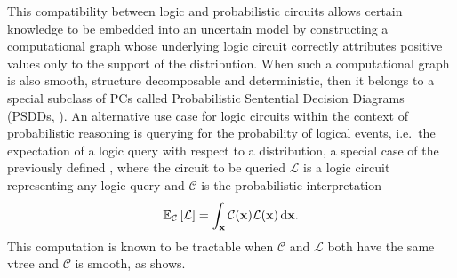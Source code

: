 This compatibility between logic and probabilistic circuits allows certain knowledge to be embedded
into an uncertain model by constructing a computational graph whose underlying logic circuit
correctly attributes positive values only to the support of the distribution. When such a
computational graph is also smooth, structure decomposable and deterministic, then it belongs to a
special subclass of PCs called Probabilistic Sentential Decision Diagrams (PSDDs, \cite{kisa14}).
An alternative use case for logic circuits within the context of probabilistic reasoning is
querying for the probability of logical events, i.e.\ the expectation of a logic query with respect
to a distribution, a special case of the previously defined , where the circuit to be
queried $\mathcal{L}$ is a logic circuit representing any logic query and $\mathcal{C}$ is the
probabilistic interpretation
\begin{equation}
  \mathbb{E}_{\mathcal{C}}\left[\mathcal{L}\right]=\int_{\mathbf{x}}\mathcal{C}(\mathbf{x})\mathcal{L}(\mathbf{x})\mathop{}\!\mathrm{d}\mathbf{x}.
\end{equation}
This computation is known to be tractable when $\mathcal{C}$ and $\mathcal{L}$ both have the same
vtree and $\mathcal{C}$ is smooth, as  shows.

